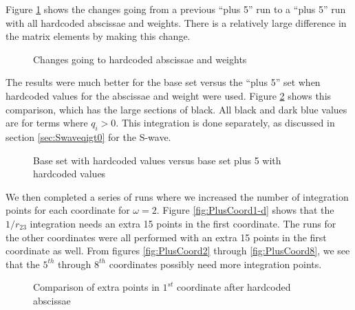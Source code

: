 \documentclass[Dissertation.tex]{subfiles}
\begin{document}
Figure \ref{fig:Base5vsBase5hardcoderound} shows the changes going from a previous ``plus 5'' run to a ``plus 5'' run with all hardcoded abscissae and weights. There is a relatively large difference in the matrix elements by making this change.
\begin{figure}[H]
	\centering
	\caption{Changes going to hardcoded abscissae and weights}
	\label{fig:Base5vsBase5hardcoderound}
\end{figure}

The results were much better for the base set versus the ``plus 5'' set when hardcoded values for the abscissae and weight were used. Figure \ref{fig:BasehardcodevsBase5hardcode} shows this comparison, which has the large sections of black. All black and dark blue values are for terms where $q_i > 0$. This integration is done separately, as discussed in section \ref{sec:Swaveqigt0} for the S-wave.
\begin{figure}[H]
	\centering
	\caption[Base set with hardcoded values vs. base set plus 5 with hardcoded values]{Base set with hardcoded values versus base set plus 5 with hardcoded values}
	\label{fig:BasehardcodevsBase5hardcode}
\end{figure}

We then completed a series of runs where we increased the number of integration points for each coordinate for $\omega = 2$. Figure \ref{fig:PlusCoord1-d} shows that the $1/r_{23}$ integration needs an extra 15 points in the first coordinate. The runs for the other coordinates were all performed with an extra 15 points in the first coordinate as well. From figures \ref{fig:PlusCoord2} through \ref{fig:PlusCoord8}, we see that the $5^{th}$ through $8^{th}$ coordinates possibly need more integration points.

\begin{figure}[H]
\centering
{}
\caption{Comparison of extra points in $1^{st}$ coordinate after hardcoded abscissae}
\label{fig:PlusCoord1}
\end{figure}
\end{document}
